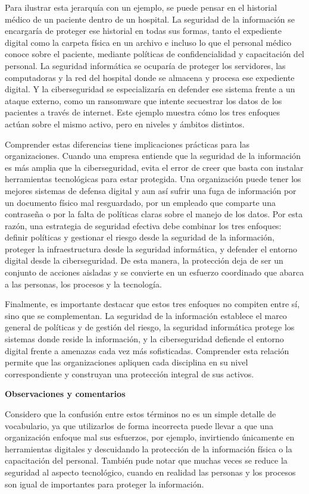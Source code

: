 \documentclass[12pt,letterpaper]{article}
\newcommand{\subtitulo}[1]{\vspace{12pt}\noindent\textbf{#1}\par\vspace{10pt}}
\begin{document}
Para ilustrar esta jerarquía con un ejemplo, se puede pensar en el historial médico de un paciente dentro de un hospital. La seguridad de la información se encargaría de proteger ese historial en todas sus formas, tanto el expediente digital como la carpeta física en un archivo e incluso lo que el personal médico conoce sobre el paciente, mediante políticas de confidencialidad y capacitación del personal. La seguridad informática se ocuparía de proteger los servidores, las computadoras y la red del hospital donde se almacena y procesa ese expediente digital. Y la ciberseguridad se especializaría en defender ese sistema frente a un ataque externo, como un ransomware que intente secuestrar los datos de los pacientes a través de internet. Este ejemplo muestra cómo los tres enfoques actúan sobre el mismo activo, pero en niveles y ámbitos distintos.

Comprender estas diferencias tiene implicaciones prácticas para las organizaciones. Cuando una empresa entiende que la seguridad de la información es más amplia que la ciberseguridad, evita el error de creer que basta con instalar herramientas tecnológicas para estar protegida. Una organización puede tener los mejores sistemas de defensa digital y aun así sufrir una fuga de información por un documento físico mal resguardado, por un empleado que comparte una contraseña o por la falta de políticas claras sobre el manejo de los datos. Por esta razón, una estrategia de seguridad efectiva debe combinar los tres enfoques: definir políticas y gestionar el riesgo desde la seguridad de la información, proteger la infraestructura desde la seguridad informática, y defender el entorno digital desde la ciberseguridad. De esta manera, la protección deja de ser un conjunto de acciones aisladas y se convierte en un esfuerzo coordinado que abarca a las personas, los procesos y la tecnología.

Finalmente, es importante destacar que estos tres enfoques no compiten entre sí, sino que se complementan. La seguridad de la información establece el marco general de políticas y de gestión del riesgo, la seguridad informática protege los sistemas donde reside la información, y la ciberseguridad defiende el entorno digital frente a amenazas cada vez más sofisticadas. Comprender esta relación permite que las organizaciones apliquen cada disciplina en su nivel correspondiente y construyan una protección integral de sus activos.

\subtitulo{Observaciones y comentarios}
Considero que la confusión entre estos términos no es un simple detalle de vocabulario, ya que utilizarlos de forma incorrecta puede llevar a que una organización enfoque mal sus esfuerzos, por ejemplo, invirtiendo únicamente en herramientas digitales y descuidando la protección de la información física o la capacitación del personal. También pude notar que muchas veces se reduce la seguridad al aspecto tecnológico, cuando en realidad las personas y los procesos son igual de importantes para proteger la información.
\end{document}
